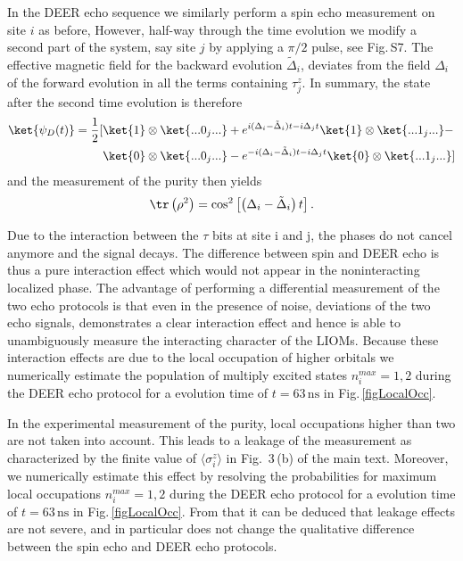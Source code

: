 In the DEER echo sequence we similarly perform a spin echo measurement on site $i$ as before, However, half-way through the time evolution we modify a second part of the system, say site $j$ by applying a $\pi/2$ pulse, see
Fig.\,S7. The effective magnetic field for the backward evolution $\tilde \Delta_i$, deviates from the field $\Delta_i$ of the forward evolution in all the terms containing $\tau_j^z$.
In summary, the state after the second time evolution is therefore
\begin{equation}
\begin{aligned}
\ket{\psi_{D}(t)} = \frac{1}{2} [& \ket{1}\otimes\ket{...0_j...} + e^{i (\Delta_i-\tilde{\Delta}_i) t - i\Delta_j t} \ket{1}\otimes \ket{...1_j...} - \\
&\ket{0}\otimes\ket{...0_j...}- e^{-i (\Delta_i-\tilde{\Delta}_i) t - i \Delta_j t} \ket{0}\otimes \ket{...1_j...}
]
\label{eq:deer_finaltime}
\end{aligned}
\end{equation}
and the measurement of the purity then yields
\begin{equation}
\tr \left(\rho^2\right) = \cos^2\left[\left(\Delta_i-\tilde{\Delta}_i\right) t\right].
\end{equation}

Due to the interaction between the $\tau$ bits at site i and j, the phases do not cancel anymore and the signal decays. The difference between spin and DEER echo is thus a pure interaction effect which would not appear in the noninteracting localized phase. The advantage of performing a differential measurement of the two echo protocols is that even in the presence of noise, deviations of the two echo signals, demonstrates a clear interaction effect and hence is able to unambiguously measure the interacting character of the LIOMs.
Because these interaction effects are due to the local occupation of higher orbitals we numerically estimate the population of multiply excited states $n_i^{max} = 1,2$ during the DEER echo protocol for a evolution time of $t = 63 \, \text{ns}$ in Fig.\,\ref{figLocalOcc}.

In the experimental measurement of the purity, local occupations higher than two are not taken into account. This leads to a leakage of the measurement as characterized by the finite value of $\langle \sigma^z_i\rangle$ in Fig. \,3\,(b) of the main text. Moreover, we numerically estimate this effect by resolving the probabilities for maximum local occupations $n_i^{max} = 1,2$ during the DEER echo protocol for a evolution time of $t = 63 \, \text{ns}$ in Fig.\,\ref{figLocalOcc}.
From that it can be deduced that leakage effects are not severe, and in particular does not change the qualitative difference between the spin echo and DEER echo protocols.
